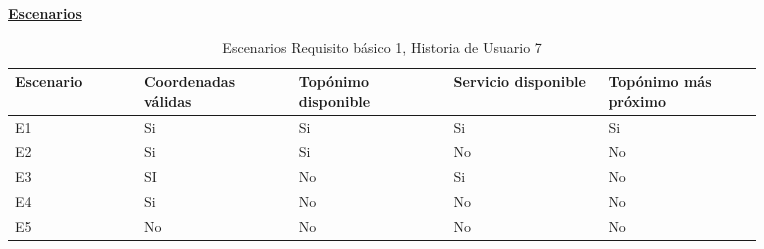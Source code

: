 \documentclass[../ei103948-project-documentation.tex]{subfiles}
\begin{document}
				\begin{center}
				\textbf{\underline{Escenarios}}
				\begin{table}[H]
					\centering
					\begin{tabular}{|p{0.15\linewidth}|p{0.18\linewidth}|p{0.18\linewidth}|p{0.18\linewidth}|p{0.18\linewidth}|}
						\hline
						\textbf{Escenario} & \textbf{Coordenadas válidas} & \textbf{Topónimo disponible} & \textbf{Servicio disponible} & \textbf{Topónimo más próximo} \\ \hline
						E1                 & Si                           & Si                           & Si                           & Si                            \\ \hline
						E2                 & Si                           & Si                           & No                           & No                            \\ \hline
						E3                 & SI                           & No                           & Si                           & No                            \\ \hline
						E4                 & Si                           & No                           & No                           & No                            \\ \hline
						E5                 & No                           & No                           & No                           & No                            \\ \hline
						\end{tabular}
					\caption{Escenarios Requisito básico 1, Historia de Usuario 7}
				\end{table}


				\descripcionBasicaG


\end{center}
\end{document}
